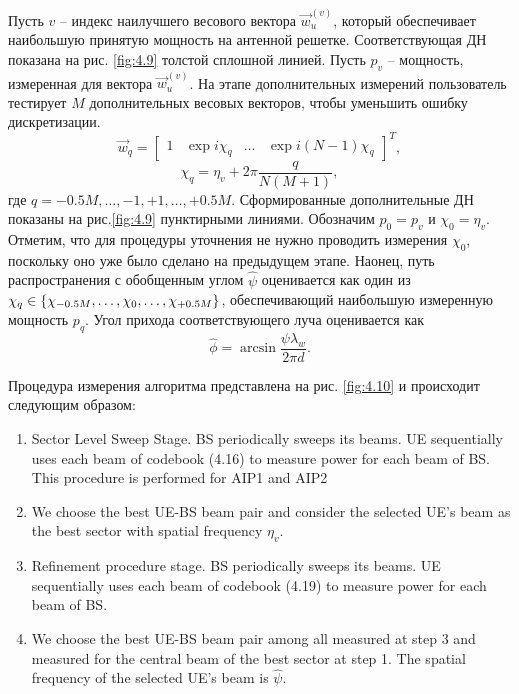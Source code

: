 Пусть $v$ -- индекс наилучшего весового вектора $\vec w_u^{(v)}$, который
обеспечивает наибольшую принятую мощность на антенной решетке.  Соответствующая
ДН показана на рис. \ref{fig:4.9} толстой сплошной линией. Пусть $p_v$ --
мощность, измеренная для вектора $\vec w_u^{(v)}$. На этапе дополнительных измерений
пользователь тестирует $M$ дополнительных весовых векторов, чтобы уменьшить
ошибку дискретизации.
\begin{equation}
    \label{eq:4.19}
    \vec w_q =
    \begin{bmatrix}
        1 & \exp {i \chi_q} & \dots & \exp{i(N-1)\chi_q}
    \end{bmatrix}^T,
\end{equation}
\begin{equation}
    \label{eq:4.20}
    \chi_q = \eta_v + 2\pi \frac{q}{N(M+1)},
\end{equation}
где $q=-0.5M,\dots,-1,+1,\dots,+0.5M$. Сформированные дополнительные ДН показаны
на рис.\ref{fig:4.9} пунктирными линиями.  Обозначим $p_0= p_v$ и $\chi_0 =
    \eta_v$. Отметим, что для процедуры уточнения не нужно проводить измерения
$\chi_0$, поскольку оно уже было сделано на предыдущем этапе.  Наонец, путь
распространения с обобщенным углом $\hat \psi$ оценивается как один из $\chi_q
    \in \qty{\chi_{-0.5 M}, \dots, \chi_0, \dots, \chi_{+0.5M}}$, обеспечивающий
наибольшую измеренную мощность $p_q$. Угол прихода соответствующего луча
оценивается как
\begin{equation}
    \label{eq:4.21}
    \hat \phi = \arcsin{\frac{\psi \lambda_w}{2\pi d}}.
\end{equation}

Процедура измерения алгоритма представлена на рис. \ref{fig:4.10} и происходит следующим образом:

\begin{enumerate}
    \item Sector Level Sweep Stage. BS periodically sweeps its beams. UE
          sequentially uses each beam of codebook (4.16) to measure power for each
          beam of BS. This procedure is performed for AIP1 and AIP2
    \item We choose the best UE-BS beam pair and consider the selected UE’s
          beam as the best sector with spatial frequency $\eta_v$.
    \item Refinement procedure stage. BS periodically sweeps its beams. UE
          sequentially uses each beam of codebook (4.19) to measure power for each
          beam of BS.
    \item We choose the best UE-BS beam pair among all measured at step 3 and
          measured for the central beam of the best sector at step 1. The spatial
          frequency of the selected UE’s beam is $\hat \psi$.
\end{enumerate}

